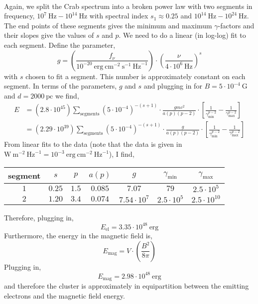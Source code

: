 \documentclass[12pt]{article}
\begin{document}
\bigskip\\
Again, we split the Crab spectrum into a broken power law with two segments in frequency, $10^{7} \: \mathrm{Hz} - 10^{14} \: \mathrm{Hz}$ with spectral index $s_1 \approx 0.25$ and $10^{14} \: \mathrm{Hz} - 10^{24} \: \mathrm{Hz}$. The end points of these segments gives the minimum and maximum $\gamma$-factors and their slopes give the values of $s$ and $p$. We need to do a linear (in log-log) fit to each segment. Define the parameter,
\[ g = \left( \frac{f_\nu}{10^{-20} \: \mathrm{erg} \: \mathrm{cm}^{-2} \: \mathrm{s}^{-1} \: \mathrm{Hz}^{-1}} \right) \cdot \left( \frac{\nu}{4 \cdot 10^6 \: \mathrm{Hz}} \right)^{s} \]  
with $s$ chosen to fit a segment. This number is approximately constant on each segment. In terms of the parameters, $g$ and $s$ and plugging in for $B = 5 \cdot 10^{-4} \: \mathrm{G}$ and $d = 2000 \: \mathrm{pc}$ we find,
\begin{align*}
E & = (2.8 \cdot 10^{45}) \sum_{\text{segments}} \left( 5 \cdot 10^{-4} \right)^{-(s+1)} \cdot \frac{g mc^2}{a(p)(p-2)} \cdot \left[ \frac{1}{\gamma_{\text{min}}^{p - 2}} - \frac{1}{\gamma_{\text{max}}^{p - 2}} \right]
\\
& = (2.29 \cdot 10^{39}) \sum_{\text{segments}} \left( 5 \cdot 10^{-4} \right)^{-(s+1)} \cdot \frac{g}{a(p)(p-2)} \cdot \left[ \frac{1}{\gamma_{\text{min}}^{p - 2}} - \frac{1}{\gamma_{\text{max}}^{p - 2}} \right]
\end{align*}
From linear fits to the data (note that the data is given in $\mathrm{W} \: \mathrm{m}^{-2} \: \mathrm{Hz}^{-1} = 10^{-3} \: \mathrm{erg} \: \mathrm{cm}^{-2} \: \mathrm{Hz}^{-1}$), I find,
\begin{center}
 \begin{tabular}{||c c c c c c c||} 
 \hline
 segment & $s$ & $p$ & $a(p)$ & $g$ & $\gamma_{\text{min}}$ & $\gamma_{\text{max}}$
 \\ [0.5ex] 
 \hline\hline
 $1$ & $0.25$ & $1.5$ & $0.085$ & $7.07$ & $79$ & $2.5 \cdot 10^5$ \\ 
 \hline
 $2$ & $1.20$ & $3.4$ & $0.074$ & $7.54 \cdot 10^7$ & $2.5 \cdot 10^5$ & $2.5 \cdot 10^{10}$ \\
 \hline
\end{tabular}
\end{center}
Therefore, plugging in,
\[ E_{\text{el}} = 3.35 \cdot 10^{48} \: \mathrm{erg} \]
Furthermore, the energy in the magnetic field is,
\[ E_{\text{mag}} = V \cdot \left( \frac{B^2}{8 \pi} \right) \]
Plugging in,
\[ E_{\text{mag}} = 2.98 \cdot 10^{48} \: \mathrm{erg} \]
and therefore the cluster is approximately in equipartition between the emitting electrons and the magnetic field energy. 
\end{document}
